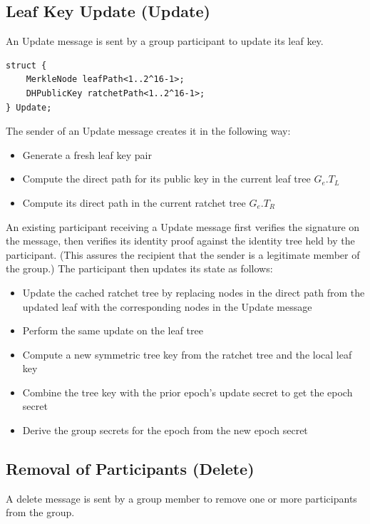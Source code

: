 \documentclass[11pt, oneside]{article}
\begin{document}
\subsection{Leaf Key Update (Update)}

An Update message is sent by a group participant to update its leaf key.

\begin{verbatim}
struct {
    MerkleNode leafPath<1..2^16-1>;
    DHPublicKey ratchetPath<1..2^16-1>;
} Update;
\end{verbatim}

The sender of an Update message creates it in the following way:

\begin{itemize}
\item{Generate a fresh leaf key pair}
\item{Compute the direct path for its public key in the current leaf tree $G_e.T_L$}
\item{Compute its direct path in the current ratchet tree $G_e.T_R$}
\end{itemize}

An existing participant receiving a Update message first verifies the signature on the message, then verifies its identity proof against the identity tree held by the participant.  (This assures the recipient that the sender is a legitimate member of the group.)  The participant then updates its state as follows:

\begin{itemize}
\item{Update the cached ratchet tree by replacing nodes in the direct path from the updated leaf with the corresponding nodes in the Update message}
\item{Perform the same update on the leaf tree}
\item{Compute a new symmetric tree key from the ratchet tree and the local leaf key}
\item{Combine the tree key with the prior epoch's update secret to get the epoch secret}
\item{Derive the group secrets for the epoch from the new epoch secret}
\end{itemize}


\subsection{Removal of Participants (Delete)}

A delete message is sent by a group member to remove one or more participants from the group.
\end{document}
